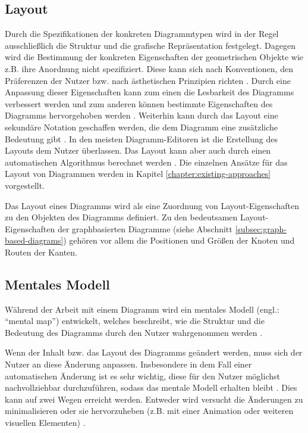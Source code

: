 \subsection{Layout}
\label{subsec:layout}

Durch die Spezifikationen der konkreten Diagrammtypen wird in der Regel ausschließlich die Struktur und die grafische Repräsentation festgelegt. Dagegen wird die Bestimmung der konkreten Eigenschaften der geometrischen Objekte wie z.B. ihre Anordnung nicht spezifiziert. Diese kann sich nach Konventionen, den Präferenzen der Nutzer bzw. nach ästhetischen Prinzipien richten \cite{Maier12A-Pattern-based, Wybrow08Using}. Durch eine Anpassung dieser Eigenschaften kann zum einen die Lesbarkeit des Diagramms verbessert werden und zum anderen können bestimmte Eigenschaften des Diagramms hervorgehoben werden \cite{Maier12A-Pattern-based}. Weiterhin kann durch das Layout eine sekundäre Notation geschaffen werden, die dem Diagramm eine zusätzliche Bedeutung gibt \cite{SeyboldGlinz03An-Effective}. In den meisten Diagramm-Editoren ist die Erstellung des Layouts dem Nutzer überlassen. Das Layout kann aber auch durch einen automatischen Algorithmus berechnet werden \cite{Maier12A-Pattern-based}. Die einzelnen Ansätze für das Layout von Diagrammen werden in Kapitel \ref{chapter:existing-approaches} vorgestellt.

Das Layout eines Diagramms wird als eine Zuordnung von Layout-Eigenschaften zu den Objekten des Diagramms definiert. Zu den bedeutsamen Layout-Eigenschaften der graphbasierten Diagramme (siehe Abschnitt \ref{subsec:graph-based-diagrams}) gehören vor allem die Positionen und Größen der Knoten und Routen der Kanten.

\subsection{Mentales Modell}
\label{subsec:mental-map}

Während der Arbeit mit einem Diagramm wird ein mentales Modell (engl.: \enquote{mental map}) entwickelt, welches beschreibt, wie die Struktur und die Bedeutung des Diagramms durch den Nutzer wahrgenommen werden \cite{Branke01Dynamic, GladischSchumann14Semi-Automatic}.

Wenn der Inhalt bzw. das Layout des Diagramms geändert werden, muss sich der Nutzer an diese Änderung anpassen. Insbesondere in dem Fall einer automatischen Änderung ist es sehr wichtig, diese für den Nutzer möglichst nachvollziehbar durchzuführen, sodass das mentale Modell erhalten bleibt \cite{Branke01Dynamic, Maier12A-Pattern-based}. Dies kann auf zwei Wegen erreicht werden. Entweder wird versucht die Änderungen zu minimalisieren oder sie hervorzuheben (z.B. mit einer Animation oder weiteren visuellen Elementen) \cite{Maier12A-Pattern-based}.

